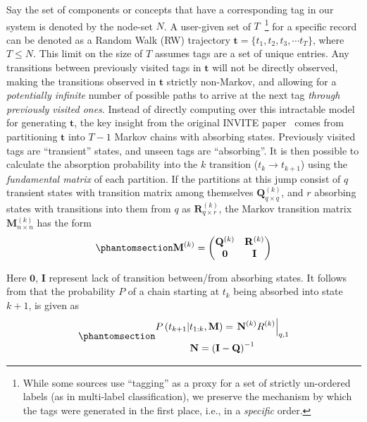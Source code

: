 \documentclass[%
	12pt,
		oneside,
		letterpaper
]{book}
\begin{document}
Say the set of components or concepts that have a corresponding tag in
our system is denoted by the node-set \(N\). A user-given set of
\(T\)~\footnote{While some sources use ``tagging'' as a proxy for a set
  of strictly un-ordered labels (as in multi-label classification), we
  preserve the mechanism by which the tags were generated in the first
  place, i.e., in a \emph{specific} order.} for a specific record can be
denoted as a Random Walk (RW) trajectory
\(\mathbf{t}=\{t_1, t_2, t_3, \cdots t_{T}\}\), where \(T\leq N\). This
limit on the size of \(T\) assumes tags are a set of unique entries. Any
transitions between previously visited tags in \(\mathbf{t}\) will not
be directly observed, making the transitions observed in \(\mathbf{t}\)
strictly non-Markov, and allowing for a \emph{potentially infinite}
number of possible paths to arrive at the next tag \emph{through
previously visited ones}. Instead of directly computing over this
intractable model for generating \(\mathbf{t}\), the key insight from
the original INVITE paper~\autocite{Humanmemorysearch_Jun2015} comes
from partitioning \(\mathbf{t}\) into \(T-1\) Markov chains with
absorbing states. Previously visited tags are ``transient'' states, and
unseen tags are ``absorbing''. It is then possible to calculate the
absorption probability into the \(k\) transition
(\(t_k \rightarrow t_{k+1}\)) using the \emph{fundamental matrix} of
each partition. If the partitions at this jump consist of \(q\)
transient states with transition matrix among themselves
\(\mathbf{Q}^{(k)}_{q\times q}\), and \(r\) absorbing states with
transitions into them from \(q\) as \(\mathbf{R}^{(k)}_{q\times r}\),
the Markov transition matrix \(\mathbf{M}^{(k)}_{n\times n}\) has the
form \begin{equation}\phantomsection\label{eq-trans-matrix}{
\mathbf{M}^{(k)} =
    \begin{pmatrix}
        \mathbf{Q}^{(k)}  & \mathbf{R}^{(k)} \\
        \mathbf{0}        & \mathbf{I}
    \end{pmatrix}
}\end{equation}

Here \(\mathbf{0}\), \(\mathbf{I}\) represent lack of transition
between/from absorbing states. It follows from
\autocite{RandomWalksElectric_Doyle2000} that the probability \(P\) of a
chain starting at \(t_k\) being absorbed into state \(k+1\), is given as
\begin{equation}\phantomsection\label{eq-absorb}{
\begin{gathered}
    P\left(t_{k+1} \middle| t_{1:k},\mathbf{M}\right) =
        \left.\mathbf{N}^{(k)}R^{(k)}\right|_{q,1}\\
\mathbf{N} = \left( \mathbf{I}-\mathbf{Q} \right) ^{-1}
\end{gathered}
}\end{equation}
\end{document}

